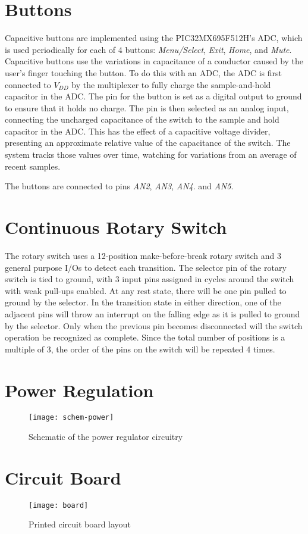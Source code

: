 \section{Buttons}
\label{sec:buttons}
Capacitive buttons are implemented using the PIC32MX695F512H's ADC, which is used periodically for each of 4 buttons: \emph{Menu/Select}, \emph{Exit}, \emph{Home}, and \emph{Mute}. Capacitive buttons use the variations in capacitance of a conductor caused by the user's finger touching the button. To do this with an ADC, the ADC is first connected to $V_{DD}$ by the multiplexer to fully charge the sample-and-hold capacitor in the ADC. The pin for the button is set as a digital output to ground to ensure that it holds no charge. The pin is then selected as an analog input, connecting the uncharged capacitance of the switch to the sample and hold capacitor in the ADC. This has the effect of a capacitive voltage divider, presenting an approximate relative value of the capacitance of the switch. The system tracks those values over time, watching for variations from an average of recent samples. 

The buttons are connected to pins \emph{AN2}, \emph{AN3}, \emph{AN4}. and \emph{AN5}.

\section{Continuous Rotary Switch}
\label{sec:rotary}
The rotary switch uses a 12-position make-before-break rotary switch and 3 general purpose I/Os to detect each transition. The selector pin of the rotary switch is tied to ground, with 3 input pins assigned in cycles around the switch with weak pull-ups enabled. At any rest state, there will be one pin pulled to ground by the selector. In the transition state in either direction, one of the adjacent pins will throw an interrupt on the falling edge as it is pulled to ground by the selector. Only when the previous pin becomes disconnected will the switch operation be recognized as complete. Since the total number of positions is a multiple of 3, the order of the pins on the switch will be repeated 4 times.

\section{Power Regulation}
\begin{figure}[H]
	\centering
	\texttt{[image: schem-power]}
	\caption[Power Regulation]%
	{Schematic of the power regulator circuitry}
\end{figure}

\section{Circuit Board}
\begin{figure}[H]
	\centering
	\texttt{[image: board]}
	\caption[PCB Layout]%
	{Printed circuit board layout}
\end{figure}
